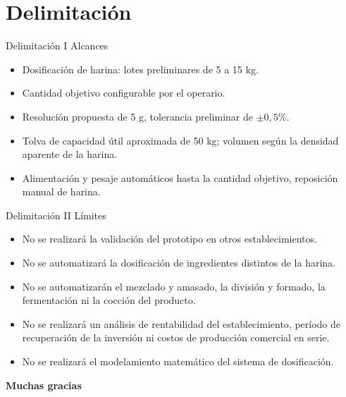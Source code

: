 \documentclass[aspectratio=169,spanish]{beamer}
\begin{document}
\section{Delimitación}
\begin{frame}{Delimitación I}
\relax
{\large\color{UCBBlue}Alcances}
\begin{itemize}
\setlength{\itemsep}{0.20cm}
\item Dosificación de harina: lotes preliminares de 5 a 15 kg.
\item Cantidad objetivo configurable por el operario.
\item Resolución propuesta de 5 g, tolerancia preliminar de $\pm 0{,}5$\%.
\item Tolva de capacidad útil aproximada de 50 kg; volumen según la densidad aparente de la harina.
\item Alimentación y pesaje automáticos hasta la cantidad objetivo, reposición manual de harina.
\end{itemize}
\end{frame}

\begin{frame}{Delimitación II}
\relax
{\large\color{UCBBlue}Límites}
\small
\begin{itemize}
\setlength{\itemsep}{0.25cm}
\item No se realizará la validación del prototipo en otros establecimientos.
\item No se automatizará la dosificación de ingredientes distintos de la harina.
\item No se automatizarán el mezclado y amasado, la división y formado, la fermentación ni la cocción del producto.
\item No se realizará un análisis de rentabilidad del establecimiento, período de recuperación de la inversión ni costos de producción comercial en serie.
\item No se realizará el modelamiento matemático del sistema de dosificación.
\end{itemize}
\end{frame}
\begin{frame}[c]
\centering
{\LARGE\bfseries\color{UCBBlue}Muchas gracias}
\end{frame}
\end{document}
